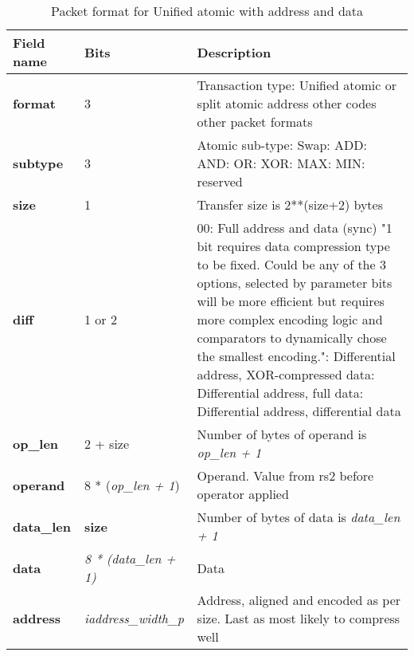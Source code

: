 \begin{table}[htp]
  \centering
  \caption{Packet format for Unified atomic with address and data}
  \label{tab:te_datadx0y5}
  \begin{tabulary}{\textwidth}{|l|p{40mm}|p{90mm}|}
    \hline
    {\bf Field name} & {\bf Bits} & {\bf Description} \\
    \hline
    \textbf{format} & 	3	& Transaction type: Unified atomic or split atomic address\newline	
		other codes other packet formats\\
    \hline
    \textbf{subtype} & 	3	& Atomic sub-type: Swap: ADD: AND: OR: XOR: MAX: MIN: reserved\\	
    \hline
    \textbf{size} & 1 & Transfer size is 2**(size+2) bytes\\
    \hline
    \textbf{diff} & 1 or 2 & 00: Full address and data (sync)	"1 bit requires data compression type to be fixed.  Could be any of the 3 options, selected by parameter bits will be more efficient but requires more complex encoding logic and comparators to dynamically chose the smallest encoding.":  Differential address, XOR-compressed data: Differential address, full data: Differential address, differential data\\
    \hline
    \textbf{op\_len} & 2 + size &	Number of bytes of operand is \textit{op\_len + 1}\\
    \hline
    \textbf{operand}	& 8 * (\textit{op\_len + 1}) & Operand.  Value from rs2 before operator applied\\
    \hline
    \textbf{data\_len}	& \textbf{size} & Number of bytes of data is \textit {data\_len + 1}\\
    \hline
    \textbf{data} & \textit {8 * (data\_len + 1)} & 
                Data\\
    \hline
    \textbf{address} &  \textit {iaddress\_width\_p} &Address, aligned and encoded as per size. Last as most likely to compress well \\
    \hline
  \end{tabulary}
\end{table}

